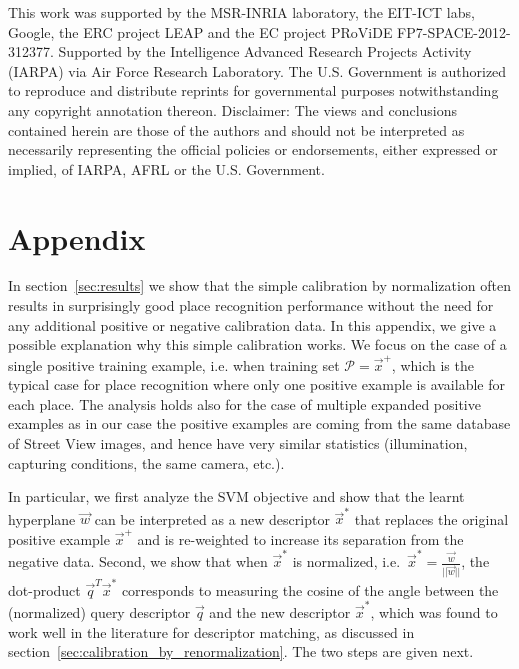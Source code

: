\begin{acknowledgements}
   This work was supported by the MSR-INRIA laboratory, the EIT-ICT labs, Google, the ERC project LEAP and the EC project PRoViDE FP7-SPACE-2012-312377.
   {
   \noindent
   Supported by the Intelligence Advanced Research Projects Activity (IARPA) via Air Force Research Laboratory. The U.S. Government is authorized to reproduce and distribute reprints for governmental purposes notwithstanding any copyright annotation thereon. Disclaimer:  The views and conclusions contained herein are those of the authors and should not be interpreted as necessarily representing the official policies or endorsements, either expressed or implied, of IARPA, AFRL or the U.S. Government.
   }
\end{acknowledgements}




{\footnotesize

}


  \section*{Appendix} %
    In section~\ref{sec:results} we show that the simple calibration by normalization often results in surprisingly good place recognition performance without the need for any additional positive or negative calibration data. In this {appendix}, we give a possible explanation why this simple calibration works.  We focus on the case of a single positive training example, i.e. when training set $\mathcal P = \vec{x}^{+}$, which is the typical case for place recognition where only one 
    {positive example is available for each place. The analysis holds also for the case of multiple expanded positive examples as in our case the positive examples are coming from the same database of Street View images, and hence have very similar statistics (illumination, capturing conditions, the same camera, etc.)}. 

    In particular, we first analyze the SVM objective and show that the learnt hyperplane $\vec{w}$ can be interpreted as a new descriptor $\vec{x}^{*}$ that replaces the original positive example $\vec{x}^{+}$ and is re-weighted to increase its separation from the negative data. 
    Second, we show that when $\vec{x}^{*}$ is normalized, i.e.\  $\vec{x}^{*} = \frac{\vec{w}}{||\vec{w}||}$, the dot-product $\vec{q}^T\vec{x}^*$ corresponds to measuring the cosine of the angle between the (normalized) query descriptor $\vec{q}$  and the new descriptor $\vec{x}^{*}$, which was found to work well in the literature for descriptor matching, as discussed in section~\ref{sec:calibration_by_renormalization}. The two steps are given next.  
    
